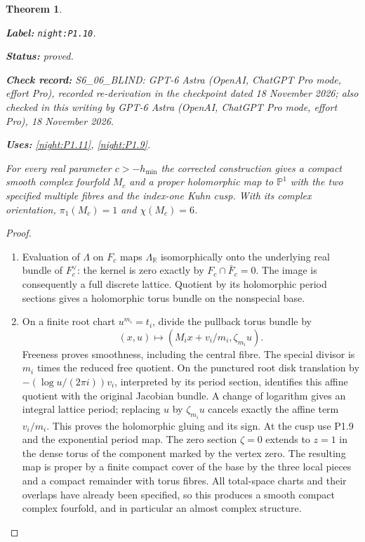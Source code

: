 \documentclass[11pt,a4paper]{article}
\newtheorem{theorem}{Theorem}[section]
\theoremstyle{definition}
\newcommand{\StatementRecord}[4]{\par\smallskip\begingroup\upshape\raggedright\noindent\textbf{Label:} \nolinkurl{#1}.\par\noindent\textbf{Status:} #2.\par\noindent\textbf{Check record:} #3.\par\noindent\textbf{Uses:} #4.\par\endgroup\smallskip}
\newcommand{\CurrentChecker}{GPT-6 Astra (OpenAI, ChatGPT Pro mode, effort Pro), 18 November 2026}
\begin{document}
\begin{theorem}\label{night:P1.10}
\StatementRecord{night:P1.10}{proved}{S6\_06\_BLIND: GPT-6 Astra (OpenAI, ChatGPT Pro mode, effort Pro), recorded re-derivation in the checkpoint dated 18 November 2026; also checked in this writing by \CurrentChecker}{\cref{night:P1.11}, \cref{night:P1.9}}
For every real parameter $c>-h_{\min}$ the corrected construction gives
a compact smooth complex fourfold $M_c$ and a proper holomorphic map
to $\mathbb P^1$ with the two specified multiple fibres and the
index-one Kuhn cusp.  With its complex orientation,
$\pi_1(M_c)=1$ and $\chi(M_c)=6$.
\end{theorem}
\begin{proof}
\begin{enumerate}[label=\arabic*.]
\item Evaluation of $\Lambda$ on $F_c$ maps $\Lambda_{\mathbb R}$
isomorphically onto the underlying real bundle of $F_c^\vee$:
the kernel is zero exactly by $F_c\cap\bar F_c=0$.
The image is consequently a full discrete lattice.  Quotient by its
holomorphic period sections gives a holomorphic torus bundle on the
nonspecial base.

\item On a finite root chart $u^{m_i}=t_i$, divide the pullback torus bundle by
\[
(x,u)\longmapsto(M_ix+v_i/m_i,\zeta_{m_i}u).
\]
Freeness proves smoothness, including the central fibre.  The special
divisor is $m_i$ times the reduced free quotient.  On the punctured
root disk translation by
$-(\log u/(2\pi i))v_i$, interpreted by its period section, identifies
this affine quotient with the original Jacobian bundle.  A change of
logarithm gives an integral lattice period; replacing $u$ by
$\zeta_{m_i}u$ cancels exactly the affine term $v_i/m_i$.
This proves the holomorphic gluing and its sign.
At the cusp use P1.9 and the exponential period map.  The zero section
$\zeta=0$ extends to $z=1$ in the dense torus of the component marked
by the vertex zero.  The resulting map is proper by a finite compact
cover of the base by the three local pieces and a compact remainder
with torus fibres.  All total-space charts and their overlaps have
already been specified, so this produces a smooth compact complex
fourfold, and in particular an almost complex structure.


\end{enumerate}
\end{proof}
\end{document}
